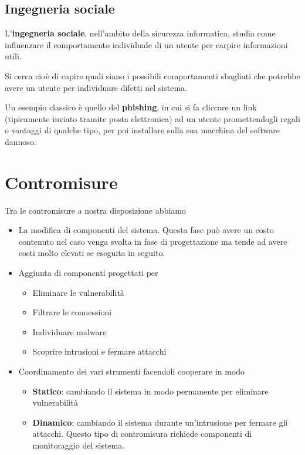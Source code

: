 \subsection{Ingegneria sociale}
L'\textbf{ingegneria sociale}, nell'ambito della sicurezza informatica, studia come influenzare il comportamento
individuale di un utente per carpire informazioni utili.

Si cerca cioè di capire quali siano i possibili comportamenti sbagliati che potrebbe avere un utente per individuare
difetti nel sistema.

Un esempio classico è quello del \textbf{phishing}, in cui si fa cliccare un link (tipicamente inviato tramite posta
elettronica) ad un utente promettendogli regali o vantaggi di qualche tipo, per poi installare sulla sua macchina
del software dannoso.

\section{Contromisure}
Tra le contromisure a nostra disposizione abbiamo
\begin{itemize}
	\item La modifica di componenti del sistema. Questa fase può avere un costo contenuto nel caso venga svolta in
	      fase di progettazione ma tende ad avere costi molto elevati se eseguita in seguito.
	\item Aggiunta di componenti progettati per
	      \begin{itemize}
		      \item Eliminare le vulnerabilità
		      \item Filtrare le connessioni
		      \item Individuare malware
		      \item Scoprire intrusioni e fermare attacchi
	      \end{itemize}
	\item Coordinamento dei vari strumenti facendoli cooperare in modo
	      \begin{itemize}
		      \item \textbf{Statico}: cambiando il sistema in modo permanente per eliminare vulnerabilità
		      \item \textbf{Dinamico}: cambiando il sistema durante un'intrusione per fermare gli attacchi. Questo tipo
		            di contromisura richiede componenti di monitoraggio del sistema.
	      \end{itemize}
\end{itemize}

